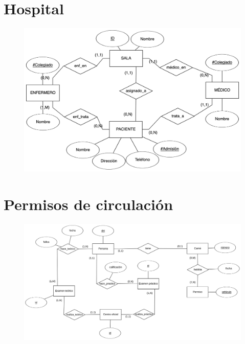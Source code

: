\documentclass[a4paper]{article}
\begin{document}
\section{Hospital}
\begin{figure}[H]
    \centering
    \includegraphics[width=\textwidth]{figs/ejercicio-4}
\end{figure}

\section{Permisos de circulación}
\begin{figure}[H]
    \centering
    \includegraphics[width=\textwidth]{figs/ejercicio-5}
\end{figure}
\end{document}
